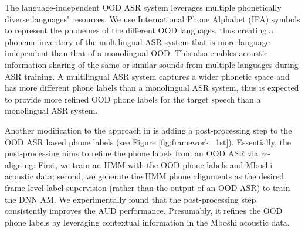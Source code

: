 \documentclass[a4paper]{article}
\begin{document}
The language-independent OOD ASR system leverages multiple phonetically diverse languages' resources. We use International Phone Alphabet (IPA) symbols \cite{international1999handbook}   to represent the phonemes of the different OOD languages, thus creating a phoneme inventory of the multilingual ASR system that is more language-independent \cite{zelasko2020sounds} than that of a monolingual OOD. This also enables acoustic information sharing of  the
same or similar 
sounds from multiple  languages during   ASR  training.   A multilingual ASR system captures a wider phonetic space and has more different phone labels than a monolingual ASR system, thus is expected to provide more refined OOD phone labels for the target speech than a monolingual  ASR system. %

Another modification to the approach in \cite{feng2020unsupervised} is adding a post-processing step to  the OOD ASR based phone labels (see Figure \ref{fig:framework_1st}). Essentially, the post-processing aims to refine the phone labels from an OOD ASR via re-aligning:
First, we train an HMM with the OOD phone labels and Mboshi acoustic data; second, we generate the HMM phone alignments as the  desired frame-level label supervision (rather than the output of an OOD ASR) to train the DNN AM. We  experimentally found that the post-processing step  consistently improves the AUD performance. Presumably, it refines the OOD phone labels by leveraging contextual information in the Mboshi acoustic data.

\end{document}
